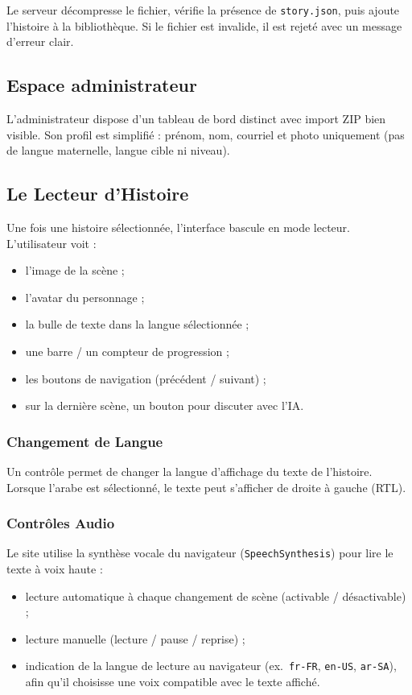 \documentclass[12pt,twoside,letterpaper]{article}
\begin{document}
Le serveur d\'ecompresse le fichier, v\'erifie la pr\'esence de \texttt{story.json},
puis ajoute l'histoire \`a la biblioth\`eque.
Si le fichier est invalide, il est rejet\'e avec un message d'erreur clair.

\subsection{Espace administrateur}

L'administrateur dispose d'un tableau de bord distinct avec import ZIP bien visible.
Son profil est simplifi\'e : pr\'enom, nom, courriel et photo uniquement
(pas de langue maternelle, langue cible ni niveau).

\subsection{Le Lecteur d'Histoire}

Une fois une histoire s\'electionn\'ee, l'interface bascule en mode lecteur.
L'utilisateur voit :
\begin{itemize}[leftmargin=*]
  \item l'image de la sc\`ene ;
  \item l'avatar du personnage ;
  \item la bulle de texte dans la langue s\'electionn\'ee ;
  \item une barre / un compteur de progression ;
  \item les boutons de navigation (pr\'ec\'edent / suivant) ;
  \item sur la derni\`ere sc\`ene, un bouton pour discuter avec l'IA.
\end{itemize}

\subsubsection{Changement de Langue}
Un contr\^ole permet de changer la langue d'affichage du texte de l'histoire.
Lorsque l'arabe est s\'electionn\'e, le texte peut s'afficher de droite \`a gauche (RTL).

\subsubsection{Contr\^oles Audio}
Le site utilise la synth\`ese vocale du navigateur (\texttt{SpeechSynthesis}) \cite{webspeech}
pour lire le texte \`a voix haute :
\begin{itemize}[leftmargin=*]
  \item lecture automatique \`a chaque changement de sc\`ene (activable / d\'esactivable) ;
  \item lecture manuelle (lecture / pause / reprise) ;
  \item indication de la langue de lecture au navigateur
  (ex.\ \texttt{fr-FR}, \texttt{en-US}, \texttt{ar-SA}),
  afin qu'il choisisse une voix compatible avec le texte affich\'e.
\end{itemize}
\end{document}

